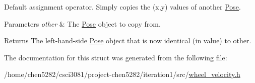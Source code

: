 Default assignment operator. Simply copies the (x,y) values of another \hyperlink{structPose}{Pose}. 


\begin{DoxyParams}{Parameters}
{\em other} & The \hyperlink{structPose}{Pose} object to copy from.\\
\hline
\end{DoxyParams}
\begin{DoxyReturn}{Returns}
The left-\/hand-\/side \hyperlink{structPose}{Pose} object that is now identical (in value) to {\ttfamily other}. 
\end{DoxyReturn}


The documentation for this struct was generated from the following file\+:\begin{DoxyCompactItemize}
\item 
/home/chen5282/csci3081/project-\/chen5282/iteration1/src/\hyperlink{wheel__velocity_8h}{wheel\+\_\+velocity.\+h}\end{DoxyCompactItemize}
